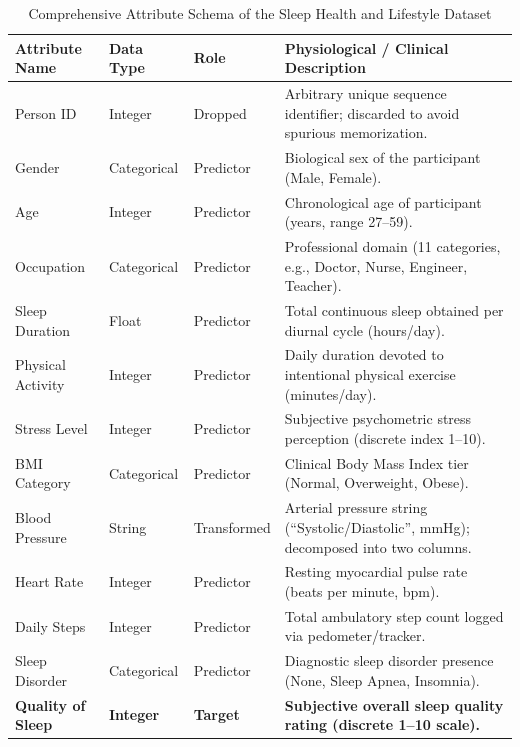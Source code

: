 \documentclass[12pt,a4paper]{article}
\begin{document}
\begin{table}[htbp]
\centering
\small
\caption{Comprehensive Attribute Schema of the Sleep Health and Lifestyle Dataset}
\label{tab:dataset_schema}
\begin{tabular}{lllp{6.8cm}}
\toprule
\textbf{Attribute Name} & \textbf{Data Type} & \textbf{Role} & \textbf{Physiological / Clinical Description} \\
\midrule
Person ID & Integer & Dropped & Arbitrary unique sequence identifier; discarded to avoid spurious memorization. \\
Gender & Categorical & Predictor & Biological sex of the participant (Male, Female). \\
Age & Integer & Predictor & Chronological age of participant (years, range 27--59). \\
Occupation & Categorical & Predictor & Professional domain (11 categories, e.g., Doctor, Nurse, Engineer, Teacher). \\
Sleep Duration & Float & Predictor & Total continuous sleep obtained per diurnal cycle (hours/day). \\
Physical Activity & Integer & Predictor & Daily duration devoted to intentional physical exercise (minutes/day). \\
Stress Level & Integer & Predictor & Subjective psychometric stress perception (discrete index 1--10). \\
BMI Category & Categorical & Predictor & Clinical Body Mass Index tier (Normal, Overweight, Obese). \\
Blood Pressure & String & Transformed & Arterial pressure string (``Systolic/Diastolic'', mmHg); decomposed into two columns. \\
Heart Rate & Integer & Predictor & Resting myocardial pulse rate (beats per minute, bpm). \\
Daily Steps & Integer & Predictor & Total ambulatory step count logged via pedometer/tracker. \\
Sleep Disorder & Categorical & Predictor & Diagnostic sleep disorder presence (None, Sleep Apnea, Insomnia). \\
\textbf{Quality of Sleep} & \textbf{Integer} & \textbf{Target} & \textbf{Subjective overall sleep quality rating (discrete 1--10 scale).} \\
\bottomrule
\end{tabular}
\end{table}
\end{document}
